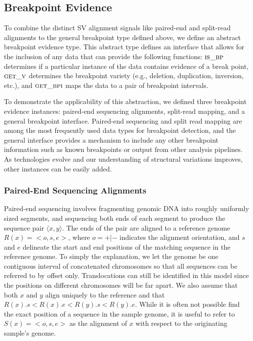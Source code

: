 \documentclass[10pt]{bmc_article}
\newenvironment{bmcformat}{\begin{raggedright}\baselineskip20pt\sloppy\setboolean{publ}{false}}{\end{raggedright}\baselineskip20pt\sloppy}
\begin{document}
\begin{bmcformat}
\subsection*{Breakpoint Evidence}

To combine the distinct SV alignment signals like paired-end and split-read
alignments to the general breakpoint type defined above, we define an
abstract breakpoint evidence type.  This abstract type defines an interface that
allows for the inclusion of any data that can provide the following functions:
$\textsc{is\_bp}$ determines if a particular instance of the data contains
evidence of a break point, $\textsc{get\_v}$ determines the breakpoint variety
(e.g., deletion, duplication, inversion, etc.), and $\textsc{get\_bpi}$
maps the data to a pair of breakpoint intervals.

To demonstrate the applicability of this abstraction, we defined three
breakpoint evidence instances: paired-end sequencing alignments, split-read
mapping, and a general breakpoint interface.  Paired-end sequencing and split
read mapping are among the most frequently used data types for breakpoint
detection, and the general interface provides a mechanism to include any other
breakpoint information such as known breakpoints or output from other analysis
pipelines.  As technologies evolve and our understanding of structural
variations improves, other instances can be easily added.

\subsubsection*{Paired-End Sequencing Alignments}

Paired-end sequencing involves fragmenting genomic DNA into roughly uniformly
sized segments, and sequencing both ends of each segment to produce the sequence
pair $\langle x,y \rangle$.  The ends of the pair are
aligned to a reference genome $R(x)=<o,s,e>$, where $o=+|-$ indicates the
alignment orientation, and $s$ and $e$ delineate the start and end positions of
the matching sequence in the reference genome.  To simply the explanation, we
let the genome be one contiguous interval of concatenated chromosomes so that
all sequences can be referred to by offset only.  Translocations can still be
identified in this model since the positions on different chromosomes will be
far apart.  We also assume that both $x$ and $y$ align uniquely to the
reference and that $R(x).s<R(x).e<R(y).s<R(y).e$.  While it is often not
possible find the exact position of a sequence in the sample genome, it is
useful to refer to $S(x)=<o,s,e>$ as the alignment of $x$ with respect to the
originating sample's genome.


\end{bmcformat}
\end{document}
